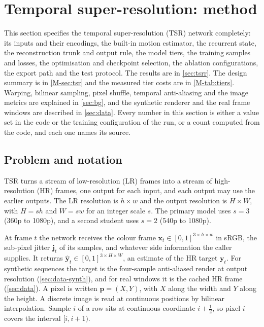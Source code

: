 \section{Temporal super-resolution: method}\label{sec:tsrm}

This section specifies the temporal super-resolution (TSR) network completely: its inputs and their encodings, the built-in motion estimator, the recurrent state, the reconstruction trunk and output rule, the model tiers, the training samples and losses, the optimisation and checkpoint selection, the ablation configurations, the export path and the test protocol. The results are in \cref{sec:tsrr}. The design summary is in \cref{M-sec:tsr} and the measured tier costs are in \cref{M-tab:tiers}. Warping, bilinear sampling, pixel shuffle, temporal anti-aliasing and the image metrics are explained in \cref{sec:bg}, and the synthetic renderer and the real frame windows are described in \cref{sec:data}. Every number in this section is either a value set in the code or the training configuration of the run, or a count computed from the code, and each one names its source.

\subsection{Problem and notation}\label{sec:tsrm-problem}

TSR turns a stream of low-resolution (LR) frames into a stream of high-resolution (HR) frames, one output for each input, and each output may use the earlier outputs. The LR resolution is $h\times w$ and the output resolution is $H\times W$, with $H=sh$ and $W=sw$ for an integer scale $s$. The primary model uses $s=3$ (360p to 1080p), and a second student uses $s=2$ (540p to 1080p).

At frame $t$ the network receives the colour frame $\mathbf{x}_t\in[0,1]^{3\times h\times w}$ in sRGB, the sub-pixel jitter $\mathbf{j}_t$ of its samples, and whatever side information the caller supplies. It returns $\hat{\mathbf{y}}_t\in[0,1]^{3\times H\times W}$, an estimate of the HR target $\mathbf{y}_t$. For synthetic sequences the target is the four-sample anti-aliased render at output resolution (\cref{sec:data-synth}), and for real windows it is the cached HR frame (\cref{sec:data}). A pixel is written $\mathbf{p}=(X,Y)$, with $X$ along the width and $Y$ along the height. A discrete image is read at continuous positions by bilinear interpolation. Sample $i$ of a row sits at continuous coordinate $i+\tfrac12$, so pixel $i$ covers the interval $[i,i+1)$.


